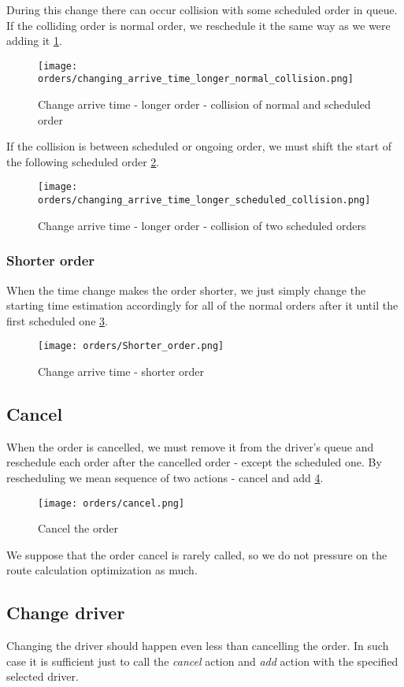 	During this change there can occur collision with some scheduled order in queue. If the colliding order is normal order, we reschedule it the same way as we were adding it \ref{order-process-change_collision_normal}. 
	
	\begin{figure}[h]\centering
		\texttt{[image: orders/changing\_arrive\_time\_longer\_normal\_collision.png]}
		\caption{Change arrive time - longer order - collision of normal and scheduled order} 
		\label{order-process-change_collision_normal}
	\end{figure} 

	If the collision is between scheduled or ongoing order, we must shift the start of the following scheduled order \ref{order-process-change_collision_scheduled}.
	
	\begin{figure}[h]\centering
		\texttt{[image: orders/changing\_arrive\_time\_longer\_scheduled\_collision.png]}
		\caption{Change arrive time - longer order - collision of two scheduled orders} 
		\label{order-process-change_collision_scheduled}
	\end{figure} 
	
	
	\subsubsection{Shorter order}
		When the time change makes the order shorter, we just simply change the starting time estimation accordingly for all of the normal orders after it until the first scheduled one
		\ref{order-process-change-shorter}.
		
		\begin{figure}[h]\centering
			\texttt{[image: orders/Shorter\_order.png]}
			\caption{Change arrive time - shorter order} 
			\label{order-process-change-shorter}
		\end{figure} 
	
\subsection{Cancel}
	When the order is cancelled, we must remove it from the driver's queue and reschedule each order after the cancelled order - except the scheduled one. By rescheduling we mean sequence of two actions - cancel and add \ref{order-process-cancel}.
	
	\begin{figure}[h]\centering
		\texttt{[image: orders/cancel.png]}
		\caption{Cancel the order} 
		\label{order-process-cancel}
	\end{figure} 
	We suppose that the order cancel is rarely called, so we do not pressure on the route calculation optimization as much.

\subsection{Change driver}
Changing the driver should happen even less than cancelling the order. In such case it is sufficient just to call the \textit{cancel} action and \textit{add} action with the specified selected driver.
	 